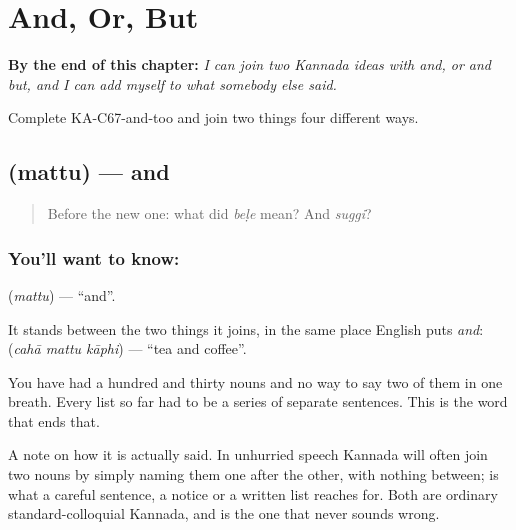 
\chapter{And, Or, But}
\label{ch:ka-and-or-but}

\begin{chapteropening}
\textbf{By the end of this chapter:} \emph{I can join two Kannada ideas with and, or and but, and I can add myself to what somebody else said.}

Complete KA-C67-and-too and join two things four different ways.
\end{chapteropening}

\section[\texorpdfstring{\kn{ಮತ್ತು} (mattu)}{ಮತ್ತು (mattu)}]{ (mattu) — and}

\label{lesson:KA-C67-and}



\begin{quote}
Before the new one: what did \emph{beḷe} mean? And \emph{suggi}?
\end{quote}

\subsection*{You'll want to know: }
\textbf{} (\emph{mattu}) — \textquotedblleft{}and\textquotedblright{}.

It stands between the two things it joins, in the same place English puts \emph{and}: \textbf{  } (\emph{cahā mattu kāphi}) — \textquotedblleft{}tea and coffee\textquotedblright{}.

You have had a hundred and thirty nouns and no way to say two of them in one breath. Every list so far had to be a series of separate sentences. This is the word that ends that.

A note on how it is actually said. In unhurried speech Kannada will often join two nouns by simply naming them one after the other, with nothing between;  is what a careful sentence, a notice or a written list reaches for. Both are ordinary standard-colloquial Kannada, and  is the one that never sounds wrong.

